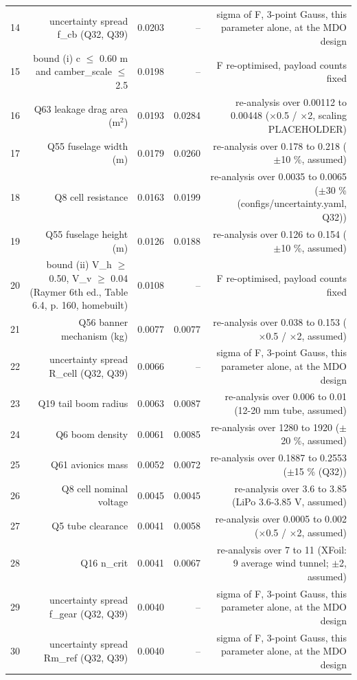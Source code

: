\begin{table}[htbp]
{\begin{tabular}{lrrrr}
14 & uncertainty spread f\_cb (Q32, Q39) & 0.0203 & -- & sigma of F, 3-point Gauss, this parameter alone, at the MDO design \\
15 & bound (i) c $\leq$ 0.60 m and camber\_scale $\leq$ 2.5 & 0.0198 & -- & F re-optimised, payload counts fixed \\
16 & Q63 leakage drag area (m$^2$) & 0.0193 & 0.0284 & re-analysis over 0.00112 to 0.00448 ($\times$0.5 / $\times$2, scaling PLACEHOLDER) \\
17 & Q55 fuselage width (m) & 0.0179 & 0.0260 & re-analysis over 0.178 to 0.218 ($\pm$10 \%, assumed) \\
18 & Q8 cell resistance & 0.0163 & 0.0199 & re-analysis over 0.0035 to 0.0065 ($\pm$30 \% (configs/uncertainty.yaml, Q32)) \\
19 & Q55 fuselage height (m) & 0.0126 & 0.0188 & re-analysis over 0.126 to 0.154 ($\pm$10 \%, assumed) \\
20 & bound (ii) V\_h $\geq$ 0.50, V\_v $\geq$ 0.04 (Raymer 6th ed., Table 6.4, p. 160, homebuilt) & 0.0108 & -- & F re-optimised, payload counts fixed \\
21 & Q56 banner mechanism (kg) & 0.0077 & 0.0077 & re-analysis over 0.038 to 0.153 ($\times$0.5 / $\times$2, assumed) \\
22 & uncertainty spread R\_cell (Q32, Q39) & 0.0066 & -- & sigma of F, 3-point Gauss, this parameter alone, at the MDO design \\
23 & Q19 tail boom radius & 0.0063 & 0.0087 & re-analysis over 0.006 to 0.01 (12-20 mm tube, assumed) \\
24 & Q6 boom density & 0.0061 & 0.0085 & re-analysis over 1280 to 1920 ($\pm$20 \%, assumed) \\
25 & Q61 avionics mass & 0.0052 & 0.0072 & re-analysis over 0.1887 to 0.2553 ($\pm$15 \% (Q32)) \\
26 & Q8 cell nominal voltage & 0.0045 & 0.0045 & re-analysis over 3.6 to 3.85 (LiPo 3.6-3.85 V, assumed) \\
27 & Q5 tube clearance & 0.0041 & 0.0058 & re-analysis over 0.0005 to 0.002 ($\times$0.5 / $\times$2, assumed) \\
28 & Q16 n\_crit & 0.0041 & 0.0067 & re-analysis over 7 to 11 (XFoil: 9 average wind tunnel; $\pm$2, assumed) \\
29 & uncertainty spread f\_gear (Q32, Q39) & 0.0040 & -- & sigma of F, 3-point Gauss, this parameter alone, at the MDO design \\
30 & uncertainty spread Rm\_ref (Q32, Q39) & 0.0040 & -- & sigma of F, 3-point Gauss, this parameter alone, at the MDO design \\

\end{tabular}}
\end{table}
